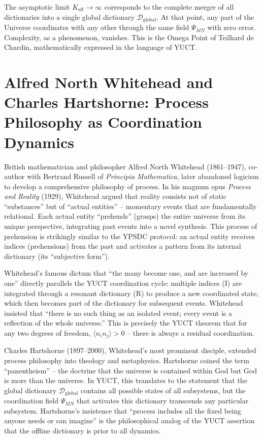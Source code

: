 \documentclass[12pt,a4paper]{article}
\newcommand{\Keff}{K_{\mathrm{eff}}}
\begin{document}
	The asymptotic limit \(\Keff \to \infty\) corresponds to the complete merger of all dictionaries into a single global dictionary \(\mathcal{D}_{\text{global}}\). At that point, any part of the Universe coordinates with any other through the same field \(\Psi_{MN}\) with zero error. Complexity, as a phenomenon, vanishes. This is the Omega Point of Teilhard de Chardin, mathematically expressed in the language of YUCT.
	
	\section{Alfred North Whitehead and Charles Hartshorne: Process Philosophy as Coordination Dynamics}
	
	British mathematician and philosopher Alfred North Whitehead (1861–1947), co-author with Bertrand Russell of \emph{Principia Mathematica}, later abandoned logicism to develop a comprehensive philosophy of process. In his magnum opus \emph{Process and Reality} (1929), Whitehead argued that reality consists not of static ``substances'' but of ``actual entities'' -- momentary events that are fundamentally relational. Each actual entity ``prehends'' (grasps) the entire universe from its unique perspective, integrating past events into a novel synthesis. This process of prehension is strikingly similar to the YPSDC protocol: an actual entity receives indices (prehensions) from the past and activates a pattern from its internal dictionary (its ``subjective form'').
	
	Whitehead's famous dictum that ``the many become one, and are increased by one'' directly parallels the YUCT coordination cycle: multiple indices (I) are integrated through a resonant dictionary (R) to produce a new coordinated state, which then becomes part of the dictionary for subsequent events. Whitehead insisted that ``there is no such thing as an isolated event; every event is a reflection of the whole universe.'' This is precisely the YUCT theorem that for any two degrees of freedom, \(\langle n_i n_j \rangle > 0\) -- there is always a residual coordination.
	
	Charles Hartshorne (1897–2000), Whitehead's most prominent disciple, extended process philosophy into theology and metaphysics. Hartshorne coined the term ``panentheism'' -- the doctrine that the universe is contained within God but God is more than the universe. In YUCT, this translates to the statement that the global dictionary \(\mathcal{D}_{\text{global}}\) contains all possible states of all subsystems, but the coordination field \(\Psi_{MN}\) that activates this dictionary transcends any particular subsystem. Hartshorne's insistence that ``process includes all the fixed being anyone needs or can imagine'' is the philosophical analog of the YUCT assertion that the offline dictionary is prior to all dynamics.
	
\end{document}
